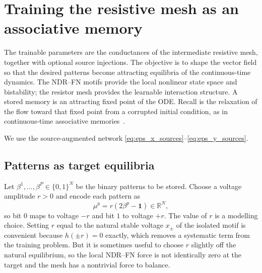 \documentclass[11pt]{article}
\begin{document}
\section{Training the resistive mesh as an associative memory}
\label{sec:training_memory}

The trainable parameters are the conductances of the intermediate
resistive mesh, together with optional source injections. The objective
is to shape the vector field so that the desired patterns become
attracting equilibria of the continuous-time dynamics. The NDR--FN
motifs provide the local nonlinear state space and bistability; the
resistor mesh provides the learnable interaction structure. A stored
memory is an attracting fixed point of the ODE. Recall is the
relaxation of the flow toward that fixed point from a corrupted initial
condition, as in continuous-time associative memories~\cite{hopfield1982,amit1985}.

We use the source-augmented network
\eqref{eq:eps_x_sources}--\eqref{eq:eps_y_sources}.

\subsection{Patterns as target equilibria}

Let $\beta^1,\ldots,\beta^P\in\{0,1\}^N$ be the binary patterns to be
stored. Choose a voltage amplitude $r>0$ and encode each pattern as
\begin{equation}
  \mu^p=r(2\beta^p-\mathbf{1})\in\mathbb{R}^N,
  \label{eq:bits_to_voltage_memory}
\end{equation}
so bit $0$ maps to voltage $-r$ and bit $1$ to voltage $+r$. The value
of $r$ is a modelling choice. Setting $r$ equal to the natural stable
voltage $x_\pm$ of the isolated motif is convenient because $h(\pm r) =
0$ exactly, which removes a systematic term from the training
problem. But it is sometimes useful to choose $r$ slightly off the
natural equilibrium, so the local NDR--FN force is not identically zero
at the target and the mesh has a nontrivial force to balance.
\end{document}
